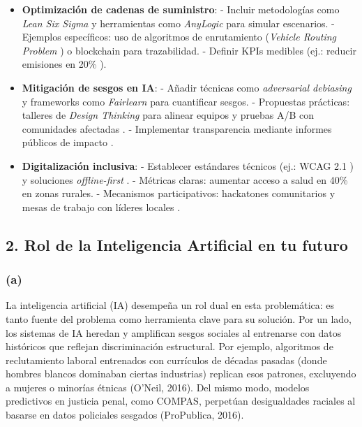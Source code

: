 \documentclass[12pt]{article}
\begin{document}
\begin{itemize}  
    \item \textbf{Optimización de cadenas de suministro}:  
    - Incluir metodologías como \textit{Lean Six Sigma} \cite{LeanSixSigma} y herramientas como \textit{AnyLogic} \cite{AnyLogic} para simular escenarios.  
    - Ejemplos específicos: uso de algoritmos de enrutamiento (\textit{Vehicle Routing Problem} \cite{VehicleRouting}) o blockchain \cite{BlockchainIBM} para trazabilidad.  
    - Definir KPIs medibles (ej.: reducir emisiones en 20\% \cite{LeanSixSigma}).  

    \item \textbf{Mitigación de sesgos en IA}:  
    - Añadir técnicas como \textit{adversarial debiasing} \cite{AdversarialDebiasing} y frameworks como \textit{Fairlearn} \cite{Fairlearn} para cuantificar sesgos.  
    - Propuestas prácticas: talleres de \textit{Design Thinking} \cite{DesignThinking} para alinear equipos y pruebas A/B con comunidades afectadas \cite{CommunityHackathons}.  
    - Implementar transparencia mediante informes públicos de impacto \cite{Barocas2019}.  

    \item \textbf{Digitalización inclusiva}:  
    - Establecer estándares técnicos (ej.: WCAG 2.1 \cite{WCAG21}) y soluciones \textit{offline-first} \cite{OfflineFirst}.  
    - Métricas claras: aumentar acceso a salud en 40\% \cite{CommunityHackathons} en zonas rurales.  
    - Mecanismos participativos: hackatones comunitarios \cite{CommunityHackathons} y mesas de trabajo con líderes locales \cite{DesignThinking}.  
\end{itemize} 

\subsection*{2. Rol de la Inteligencia Artificial en tu futuro}

\subsubsection*{(a)}

La inteligencia artificial (IA) desempeña un rol dual en esta problemática: es tanto fuente del problema como herramienta clave para su solución. Por un lado, los sistemas de IA heredan y amplifican sesgos sociales al entrenarse con datos históricos que reflejan discriminación estructural. Por ejemplo, algoritmos de reclutamiento laboral entrenados con currículos de décadas pasadas (donde hombres blancos dominaban ciertas industrias) replican esos patrones, excluyendo a mujeres o minorías étnicas (O’Neil, 2016). Del mismo modo, modelos predictivos en justicia penal, como COMPAS, perpetúan desigualdades raciales al basarse en datos policiales sesgados (ProPublica, 2016).
\end{document}
